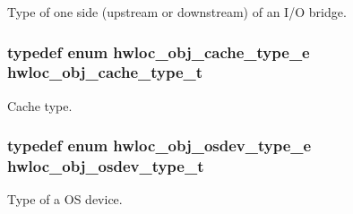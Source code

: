 Type of one side (upstream or downstream) of an I/O bridge. 

\hypertarget{a00041_gab6e1e7efedae8b341f3ee14fbe53d66c}{
\subsubsection[{hwloc\_\-obj\_\-cache\_\-type\_\-t}]{\setlength{\rightskip}{0pt plus 5cm}typedef enum {\bf hwloc\_\-obj\_\-cache\_\-type\_\-e}  {\bf hwloc\_\-obj\_\-cache\_\-type\_\-t}}}
\label{a00041_gab6e1e7efedae8b341f3ee14fbe53d66c}


Cache type. 

\hypertarget{a00041_ga90c1e82a60ba5871d07645169e636987}{
\subsubsection[{hwloc\_\-obj\_\-osdev\_\-type\_\-t}]{\setlength{\rightskip}{0pt plus 5cm}typedef enum {\bf hwloc\_\-obj\_\-osdev\_\-type\_\-e}  {\bf hwloc\_\-obj\_\-osdev\_\-type\_\-t}}}
\label{a00041_ga90c1e82a60ba5871d07645169e636987}


Type of a OS device. 



